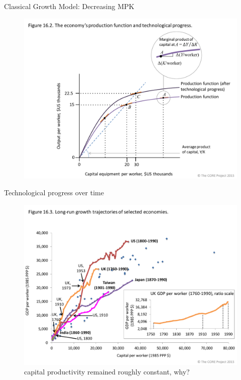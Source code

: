 \documentclass[11pt,aspectratio=43,usenames,dvipsnames]{beamer}
\theoremstyle{definition}
\begin{document}
\begin{frame}{Classical Growth Model: Decreasing MPK}
\label{slide:Classical_Growth_Model__Decreasing_MPK}
    \begin{figure}
        \centering
        \includegraphics[width=.9\textwidth]{./figures/3.pdf}
    \end{figure}

\end{frame}

\begin{frame}{Technological progress over time}
\label{slide:Technological_progress_over_time}
    \begin{figure}
        \centering
        \includegraphics[width=.8\textwidth]{./figures/4.pdf}
        \caption{capital productivity remained roughly constant, why?}
    \end{figure}

\end{frame}
\end{document}
